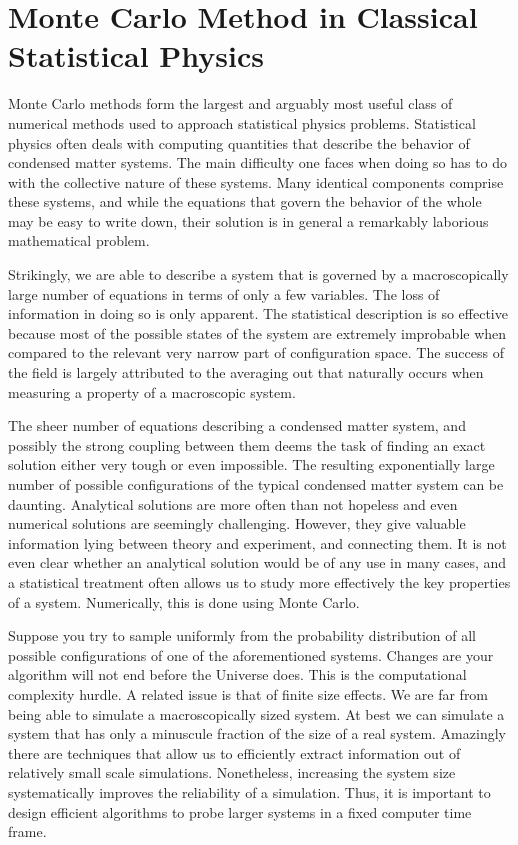 \section{Monte Carlo Method in Classical Statistical Physics}
\label{sec:classical_mc}

Monte Carlo methods form the largest and arguably most useful class of numerical methods used to approach statistical physics problems.
Statistical physics often deals with computing quantities that describe the behavior of condensed matter systems.
The main difficulty one faces when doing so has to do with the collective nature of these systems.
Many identical components comprise these systems, and while the equations that govern the behavior of the whole may be easy to write down, their solution is in general a remarkably laborious mathematical problem.

Strikingly, we are able to describe a system that is governed by a macroscopically large number of equations in terms of only a few variables.
The loss of information in doing so is only apparent.
The statistical description is so effective because most of the possible states of the system are extremely improbable when compared to the relevant very narrow part of configuration space.
The success of the field is largely attributed to the averaging out that naturally occurs when measuring a property of a macroscopic system.

The sheer number of equations describing a condensed matter system, and possibly the strong coupling between them deems the task of finding an exact solution either very tough or even impossible.
The resulting exponentially large number of possible configurations of the typical condensed matter system can be daunting.
Analytical solutions are more often than not hopeless and even numerical solutions are seemingly challenging.
However, they give valuable information lying between theory and experiment, and connecting them.
It is not even clear whether an analytical solution would be of any use in many cases, and a statistical treatment often allows us to study more effectively the key properties of a system.
Numerically, this is done using Monte Carlo.

Suppose you try to sample uniformly from the probability distribution of all possible configurations of one of the aforementioned systems.
Changes are your algorithm will not end before the Universe does.
This is the computational complexity hurdle.
A related issue is that of finite size effects.
We are far from being able to simulate a macroscopically sized system. 
At best we can simulate a system that has only a minuscule fraction of the size of a real system.
Amazingly there are techniques that allow us to efficiently extract information out of relatively small scale simulations.
Nonetheless, increasing the system size systematically improves the reliability of a simulation.
Thus, it is important to design efficient algorithms to probe larger  systems in a fixed computer time frame.

